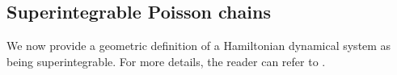 \documentclass[11pt]{amsart}
\theoremstyle{definition}
\newtheorem{definition}[theorem]{Definition}
\theoremstyle{plain}
\theoremstyle{conclusion}
\begin{document}


\subsection{Superintegrable Poisson chains}

We now provide a geometric definition of a Hamiltonian dynamical system as being superintegrable. For more details, the reader can refer to \cite{MR3493688}. 


\end{document}

